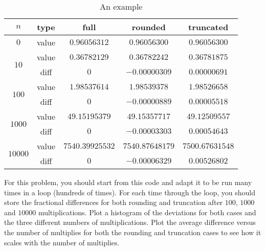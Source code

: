 \begin{table}[H]
    \centering
    \caption{An example}
    \label{tab:compare}
    \begin{tabular}{@{}ccccc@{}}
        \toprule
        $n$                      & type  & full            & rounded         & truncated       \\
        \midrule
        $0$                      & value & $0.96056312$    & $0.96056300$    & $0.96056300$    \\
        \cmidrule{1-2}
        \multirow{2}{*}{$10$}    & value & $0.36782129$    & $0.36782242$    & $0.36781875$    \\
                                 & diff  & $0$             & $-0.00000309$   & $0.00000691$    \\
        \cmidrule{1-2}
        \multirow{2}{*}{$100$}   & value & $1.98537614$    & $1.98539378$    & $1.98526658$    \\
                                 & diff  & $0$             & $-0.00000889$   & $0.00005518$    \\
        \cmidrule{1-2}
        \multirow{2}{*}{$1000$}  & value & $49.15195379$   & $49.15357717$   & $49.12509557$   \\
                                 & diff  & $0$             & $-0.00003303$   & $0.00054643$    \\
        \cmidrule{1-2}
        \multirow{2}{*}{$10000$} & value & $7540.39925532$ & $7540.87648179$ & $7500.67631548$ \\
                                 & diff  & $0$             & $-0.00006329$   & $0.00526802$    \\
        \bottomrule
    \end{tabular}
\end{table}

\Question For this problem, you should start from this code and adapt it to be run many times in a
loop (hundreds of times). For each time through the loop, you should store the fractional
differences for both rounding and truncation after $100$, $1000$ and $10000$ multiplications.
Plot a histogram of the deviations for both cases and the three different numbers of
multiplications. Plot the average difference versus the number of multiplies for both the
rounding and truncation cases to see how it scales with the number of multiplies.
